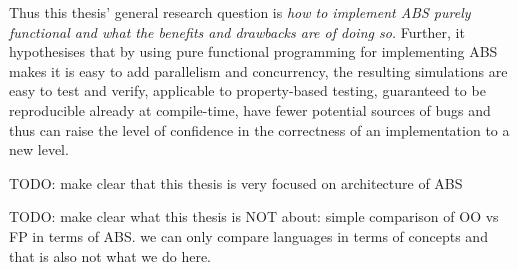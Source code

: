 Thus this thesis' general research question is \textit{how to implement ABS purely functional and what the benefits and drawbacks are of doing so.} Further, it hypothesises that by using pure functional programming for implementing ABS makes it is easy to add parallelism and concurrency, the resulting simulations are easy to test and verify, applicable to property-based testing, guaranteed to be reproducible already at compile-time, have fewer potential sources of bugs and thus can raise the level of confidence in the correctness of an implementation to a new level.

\newpage
TODO: make clear that this thesis is very focused on architecture of ABS

TODO: make clear what this thesis is NOT about: simple comparison of OO vs FP in terms of ABS. we can only compare languages in terms of concepts and that is also not what we do here. 

